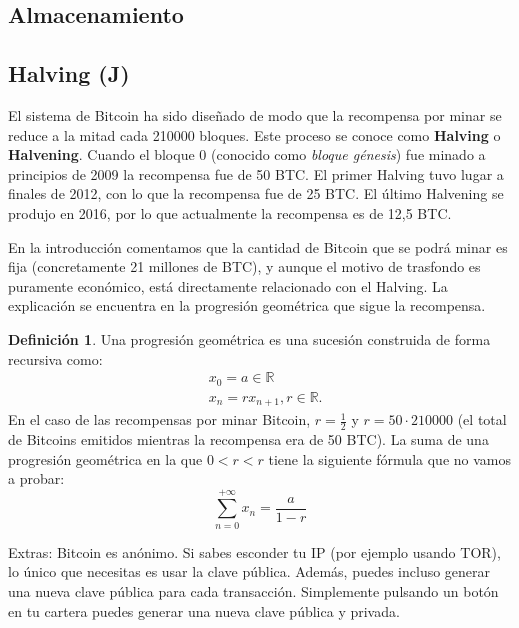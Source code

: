 \documentclass[twoside]{article}
\theoremstyle{definition}
\newtheorem{defi}[teorema]{Definición}
\newcommand{\R}{\mathbb{R}}
\begin{document}
\subsection{Almacenamiento}
\subsection{Halving (J)}
El sistema de Bitcoin ha sido diseñado de modo que la recompensa por minar se reduce a la mitad cada 210000 bloques. Este proceso se conoce como \textbf{Halving} o \textbf{Halvening}. Cuando el bloque 0 (conocido como \emph{bloque génesis}) fue minado a principios de 2009 la recompensa fue de 50 BTC. El primer Halving tuvo lugar a finales de 2012, con lo que la recompensa fue de 25 BTC. El último Halvening se produjo en 2016, por lo que actualmente la recompensa es de 12,5 BTC.  

En la introducción comentamos que la cantidad de Bitcoin que se podrá minar es fija (concretamente 21 millones de BTC), y aunque el motivo de trasfondo es puramente económico, está directamente relacionado con el Halving. La explicación se encuentra en la progresión geométrica que sigue la recompensa. 

\begin{defi}
Una progresión geométrica es una sucesión construida de forma recursiva como:
\begin{align*}
&x_0=a\in\R\\
&x_n=rx_{n+1}, r\in\R .
\end{align*}
En el caso de las recompensas por minar Bitcoin, $r=\frac{1}{2}$ y $r=50\cdot 210000$ (el total de Bitcoins emitidos mientras la recompensa era de 50 BTC). La suma de una progresión geométrica en la que $0<r<r$ tiene la siguiente fórmula que no vamos a probar:
\[
\sum_{n=0}^{+\infty}x_n=\frac{a}{1-r}
\]
\end{defi}









Extras: Bitcoin es anónimo. Si sabes esconder tu IP (por ejemplo usando TOR), lo único que necesitas es usar la clave pública. Además, puedes incluso generar una nueva clave pública para cada transacción. Simplemente pulsando un botón en tu cartera puedes generar una nueva clave pública y privada.
\end{document}
